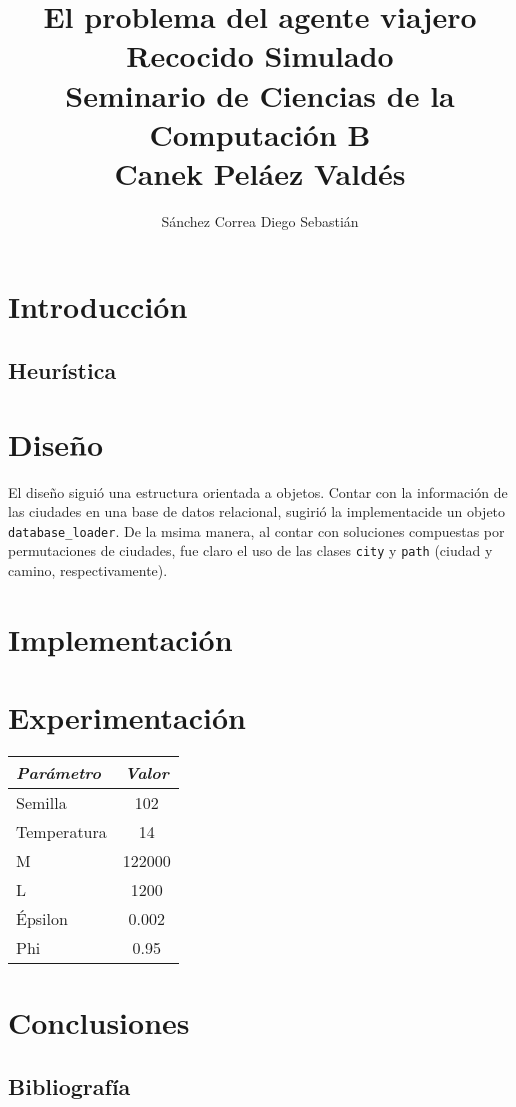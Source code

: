 \documentclass[a4paper]{report}
\title {\textbf {\Large{El problema del agente viajero}}\protect\\
  \large{\textbf{Recocido Simulado}}\protect\\ \vspace{0.4cm}
  \normalsize{\textbf{Seminario de Ciencias de la Computaci\'on B}} \protect\\ \vspace{0.2cm}
  \normalsize{Canek Pel\'aez Vald\'es}}
\date{}
\author{\normalsize Sánchez Correa Diego Sebastián}
\begin{document}
\allowdisplaybreaks
\maketitle
\tableofcontents

\chapter{Introducci\'on}
\section{Heur\'istica}
\chapter{Dise\~no}

El dise\~no sigui\'o una estructura orientada a objetos. Contar con la informaci\'on
de las ciudades en una base de datos relacional, sugiri\'o la implementaci\on de
un objeto \texttt{database_loader}. De la msima manera, al contar con soluciones
compuestas por permutaciones de ciudades, fue claro el uso de las clases \texttt{city}
y \texttt{path} (ciudad y camino, respectivamente).

\chapter{Implementaci\'on}
\chapter{Experimentaci\'on}

\begin{table}[h!]
  \begin{center}
    \begin{tabular}{||l|c||}
      \hline
      \textit{Par\'ametro} & \textit{Valor}\\
      \hline
      Semilla & 102 \\
      Temperatura & 14 \\
      M & 122000 \\
      L & 1200 \\
      \'Epsilon & 0.002 \\
      Phi & 0.95 \\
      \hline
    \end{tabular}
  \end{center}
\end{table}


%   


%   

\chapter{Conclusiones}

\section{Bibliograf\'ia}
\end{document}
